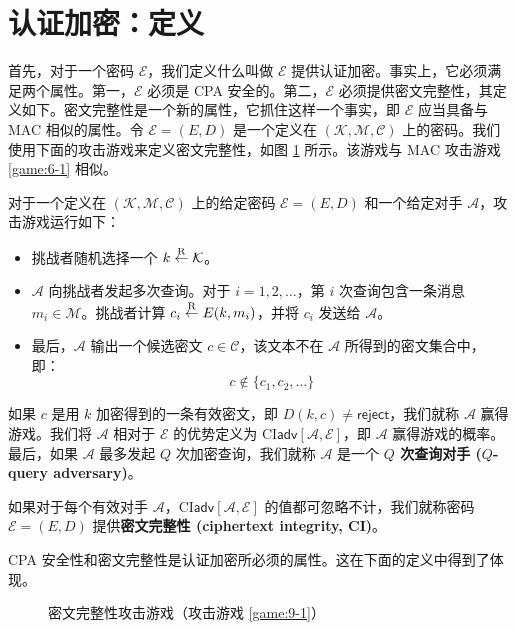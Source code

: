 \section{认证加密：定义}\label{sec:9-1}

首先，对于一个密码 $\mathcal{E}$，我们定义什么叫做 $\mathcal{E}$ 提供认证加密。事实上，它必须满足两个属性。第一，$\mathcal{E}$ 必须是 CPA 安全的。第二，$\mathcal{E}$ 必须提供密文完整性，其定义如下。密文完整性是一个新的属性，它抓住这样一个事实，即 $\mathcal{E}$ 应当具备与 MAC 相似的属性。令 $\mathcal{E}=(E,D)$ 是一个定义在 $(\mathcal{K},\mathcal{M},\mathcal{C})$ 上的密码。我们使用下面的攻击游戏来定义密文完整性，如图 \ref{fig:9-2} 所示。该游戏与 MAC 攻击游戏 \ref{game:6-1} 相似。

\begin{game}[密文完整性]\label{game:9-1}
对于一个定义在 $(\mathcal{K},\mathcal{M},\mathcal{C})$ 上的给定密码 $\mathcal{E}=(E,D)$ 和一个给定对手 $\mathcal{A}$，攻击游戏运行如下：
\begin{itemize}
	\item 挑战者随机选择一个 $k\overset{\rm R}\leftarrow\mathcal{K}$。
	\item $\mathcal{A}$ 向挑战者发起多次查询。对于 $i=1,2,\dots$，第 $i$ 次查询包含一条消息 $m_i\in\mathcal{M}$。挑战者计算 $c_i\overset{\rm R}\leftarrow E(k, m_i)$，并将 $c_i$ 发送给 $\mathcal{A}$。
	\item 最后，$\mathcal{A}$ 输出一个候选密文 $c\in\mathcal{C}$，该文本不在 $\mathcal{A}$ 所得到的密文集合中，即：
	\[
	c\notin\{c_1,c_2,\dots\}
	\]
\end{itemize}
如果 $c$ 是用 $k$ 加密得到的一条有效密文，即 $D(k,c)\neq\mathsf{reject}$，我们就称 $\mathcal{A}$ 赢得游戏。我们将 $\mathcal{A}$ 相对于 $\mathcal{E}$ 的优势定义为 $\mathrm{CI}\mathsf{adv}[\mathcal{A},\mathcal{E}]$，即 $\mathcal{A}$ 赢得游戏的概率。最后，如果 $\mathcal{A}$ 最多发起 $Q$ 次加密查询，我们就称 $\mathcal{A}$ 是一个 \textbf{$Q$ 次查询对手 ($Q$-query adversary)}。
\end{game}

\begin{definition}\label{def:9-1}
如果对于每个有效对手 $\mathcal{A}$，$\mathrm{CI}\mathsf{adv}[\mathcal{A},\mathcal{E}]$ 的值都可忽略不计，我们就称密码 $\mathcal{E}=(E,D)$ 提供\textbf{密文完整性 (ciphertext integrity, CI)}。
\end{definition}

CPA 安全性和密文完整性是认证加密所必须的属性。这在下面的定义中得到了体现。

\begin{figure}
  \centering
  
  \caption{密文完整性攻击游戏（攻击游戏 \ref{game:9-1}）}
  \label{fig:9-2}
\end{figure}

